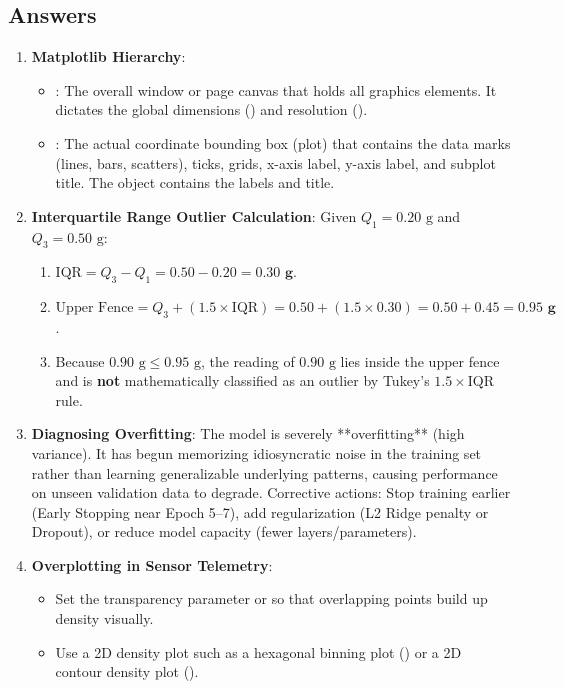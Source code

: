 \subsection*{Answers}

\begin{enumerate}
    \item \textbf{Matplotlib Hierarchy}:
    \begin{itemize}
        \item \textbf{}: The overall window or page canvas that holds all graphics elements. It dictates the global dimensions () and resolution ().
        \item \textbf{}: The actual coordinate bounding box (plot) that contains the data marks (lines, bars, scatters), ticks, grids, x-axis label, y-axis label, and subplot title. The  object contains the labels and title.
    \end{itemize}

    \item \textbf{Interquartile Range Outlier Calculation}:
    Given $Q_1 = 0.20\text{ g}$ and $Q_3 = 0.50\text{ g}$:
    \begin{enumerate}[label=(\alph*)]
        \item $\text{IQR} = Q_3 - Q_1 = 0.50 - 0.20 = \mathbf{0.30\text{ g}}$.
        \item $\text{Upper Fence} = Q_3 + (1.5 \times \text{IQR}) = 0.50 + (1.5 \times 0.30) = 0.50 + 0.45 = \mathbf{0.95\text{ g}}$.
        \item Because $0.90\text{ g} \le 0.95\text{ g}$, the reading of $0.90\text{ g}$ lies inside the upper fence and is \textbf{not} mathematically classified as an outlier by Tukey's $1.5 \times \text{IQR}$ rule.
    \end{enumerate}

    \item \textbf{Diagnosing Overfitting}:
    The model is severely **overfitting** (high variance). It has begun memorizing idiosyncratic noise in the training set rather than learning generalizable underlying patterns, causing performance on unseen validation data to degrade. 
    Corrective actions: Stop training earlier (Early Stopping near Epoch 5--7), add regularization (L2 Ridge penalty or Dropout), or reduce model capacity (fewer layers/parameters).

    \item \textbf{Overplotting in Sensor Telemetry}:
    \begin{itemize}
        \item Set the transparency parameter  or  so that overlapping points build up density visually.
        \item Use a 2D density plot such as a hexagonal binning plot () or a 2D contour density plot ().
    \end{itemize}


\end{enumerate}
